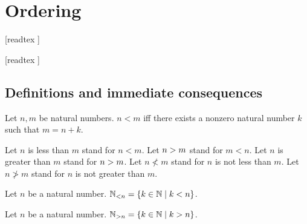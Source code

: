 \documentclass[../arithmetic.tex]{subfiles}
\begin{document}
  \chapter{Ordering}\label{chapter:ordering}


  \begin{forthel}

    [readtex ]

    [readtex ]

  \end{forthel}


  \section{Definitions and immediate consequences}

  \begin{forthel}
    \begin{definition}
      Let $n, m$ be natural numbers.
      $n \less m$ iff there exists a nonzero natural number $k$ such that
      $m = n \plus k$.
    \end{definition}

    Let $n$ is less than $m$ stand for $n \less m$.
    Let $n > m$ stand for $m \less n$.
    Let $n$ is greater than $m$ stand for $n > m$.
    Let $n \nless m$ stand for $n$ is not less than $m$.
    Let $n \ngtr m$ stand for $n$ is not greater than $m$.
  \end{forthel}

  \begin{forthel}
    \begin{definition}
      Let $n$ be a natural number.
      $\mathbb{N}_{< n} = \{ k \in \mathbb{N} \mid k < n \}$.
    \end{definition}
  \end{forthel}

  \begin{forthel}
    \begin{definition}
      Let $n$ be a natural number.
      $\mathbb{N}_{> n} = \{ k \in \mathbb{N} \mid k > n \}$.
    \end{definition}
  \end{forthel}
\end{document}
